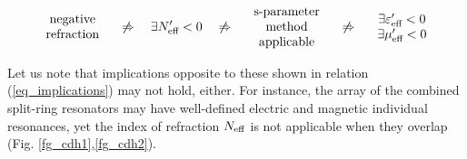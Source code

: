 \begin{equation}
\begin{array}{c} \text{negative}\\ \text{refraction} \end{array}
\quad\not\Rightarrow\quad  \exists N_{\text{eff} }' < 0 
\quad\not\Rightarrow\quad \begin{array}{c} \text{s-parameter}\\ \text{method}\\ \text{applicable}  \end{array}
\quad\not\Rightarrow\quad \begin{array}{c} \exists \varepsilon_{\text{eff} }'<0\\ \exists\mu_{\text{eff} }'<0  \end{array} 
\label{eq_implications}\end{equation} %

Let us note that implications opposite to these shown in relation (\ref{eq_implications}) may not hold, either.  For instance, the array of the combined split-ring resonators may have well-defined electric and magnetic individual resonances, yet the index of refraction $N_{\text{eff} }$ is not applicable when they overlap  (Fig. \ref{fg_cdh1},\ref{fg_cdh2}).








